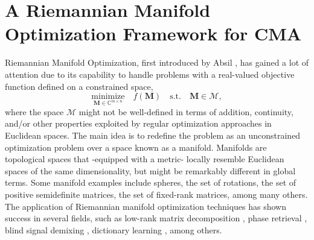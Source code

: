 \chapter{A Riemannian Manifold Optimization Framework for CMA}
\label{chap:RTR}

Riemannian Manifold Optimization, first introduced by Absil \cite{Absil2008book}, has gained a lot of attention due to its capability to handle problems with a real-valued objective function defined on a constrained space,
\begin{equation}
\underset{\bm{M}\in\mathbb{C}^{m\times n}}{\text{minimize}}\quad f({\bm{M}})\quad\text{s.t.}\quad\bm{M}\in\mathcal{M},
\end{equation} where the space $\mathcal{M}$ might not be well-defined in terms of addition, continuity, and/or other properties exploited by regular optimization approaches in Euclidean spaces. The main idea is to redefine the problem as an unconstrained optimization problem over a space known as a manifold. Manifolds are topological spaces that -equipped with a metric- locally resemble Euclidean spaces of the same dimensionality, but might be remarkably different in global terms.
Some manifold examples include spheres, the set of rotations, the set of positive semidefinite matrices, the set of fixed-rank matrices, among many others. The application of Riemannian manifold optimization techniques has shown success in several fields, such as low-rank matrix decomposition \cite{Yang2016lowrankfogran}, phase retrieval \cite{}, blind signal demixing \cite{Dong2018b}, dictionary learning \cite{}, among others.

